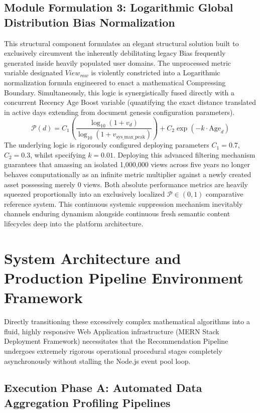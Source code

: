 \documentclass[journal]{IEEEtran}
\begin{document}
\subsection{Module Formulation 3: Logarithmic Global Distribution Bias Normalization}

This structural component formulates an elegant structural solution built to exclusively circumvent the inherently debilitating legacy Bias frequently generated inside heavily populated user domains. 
The unprocessed metric variable designated $View_{raw}$ is violently constricted into a Logarithmic normalization formula engineered to enact a mathematical Compressing Boundary. 
Simultaneously, this logic is synergistically fused directly with a concurrent Recency Age Boost variable (quantifying the exact distance translated in active days extending from document genesis configuration parameters).
\begin{equation}
\label{eq:pop}
\mathcal{P}(d) = C_1 \left( \frac{\log_{10}(1 + v_d)}{\log_{10}(1 + v_{\text{sys\_max\_peak}})} \right) + C_2 \exp(-k \cdot \text{Age}_{d})
\end{equation}
The underlying logic is rigorously configured deploying parameters $C_1 = 0.7$, $C_2 = 0.3$, whilst specifying $k = 0.01$. 
Deploying this advanced filtering mechanism guarantees that amassing an isolated 1,000,000 views across five years no longer behaves computationally as an infinite metric multiplier against a newly created asset possessing merely 0 views. 
Both absolute performance metrics are heavily squeezed proportionally into an exclusively localized $\mathcal{P} \in (0, 1)$ comparative reference system. 
This continuous systemic suppression mechanism inevitably channels enduring dynamism alongside continuous fresh semantic content lifecycles deep into the platform architecture.

\section{System Architecture and Production Pipeline Environment Framework}
\label{sec:architecture}

Directly transitioning these excessively complex mathematical algorithms into a fluid, highly responsive Web Application infrastructure (MERN Stack Deployment Framework) necessitates that the Recommendation Pipeline undergoes extremely rigorous operational procedural stages completely asynchronously without stalling the Node.js event pool loop.

\subsection{Execution Phase A: Automated Data Aggregation Profiling Pipelines}
\end{document}
